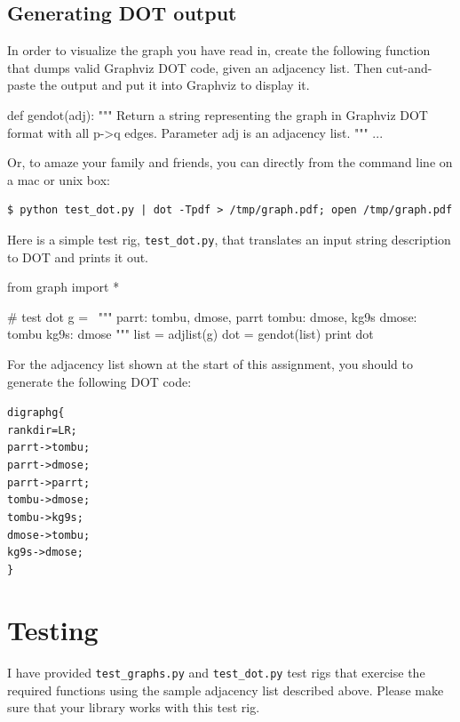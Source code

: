 \begin{fullwidth}
\subsection{Generating DOT output}

In order to visualize the graph you have read in, create the following function that dumps valid Graphviz DOT code, given an adjacency list. Then cut-and-paste the output and put it into Graphviz to display it.
 
\begin{pyverbatim}
def gendot(adj):
    """
    Return a string representing the graph in Graphviz DOT format
    with all p->q edges. Parameter adj is an adjacency list.
    """
    ...
\end{pyverbatim}

\noindent Or, to amaze your family and friends, you can directly from the command line on a mac or unix box:

\begin{lstlisting}[style=BashInputStyle]
$ python test_dot.py | dot -Tpdf > /tmp/graph.pdf; open /tmp/graph.pdf
\end{lstlisting}

Here is a simple test rig, {\tt test\_dot.py}, that translates an input string description to DOT and prints it out.

\begin{pyverbatim}
from graph import *

# test dot
g = \
"""
parrt: tombu, dmose, parrt
tombu: dmose, kg9s
dmose: tombu
kg9s: dmose
"""
list = adjlist(g)
dot = gendot(list)
print dot
\end{pyverbatim}

\noindent For the adjacency list shown at the start of this assignment, you should to generate the following DOT code:

\begin{alltt}\small
digraph g \{
  rankdir=LR;
  parrt -> tombu;
  parrt -> dmose;
  parrt -> parrt;
  tombu -> dmose;
  tombu -> kg9s;
  dmose -> tombu;
  kg9s -> dmose;
\}
\end{alltt}

\section{Testing}

I have provided {\tt test\_graphs.py} and {\tt test\_dot.py}  test rigs that exercise the required functions using the sample adjacency list described above. Please make sure that your library works with this test rig.


\end{fullwidth}
